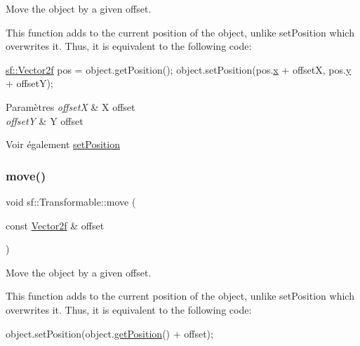 Move the object by a given offset. 

This function adds to the current position of the object, unlike set\+Position which overwrites it. Thus, it is equivalent to the following code\+: 
\begin{DoxyCode}
\hyperlink{classsf_1_1Vector2}{sf::Vector2f} pos = \textcolor{keywordtype}{object}.getPosition();
\textcolor{keywordtype}{object}.setPosition(pos.\hyperlink{classsf_1_1Vector2_a1e6ad77fa155f3753bfb92699bd28141}{x} + offsetX, pos.\hyperlink{classsf_1_1Vector2_a420f2481b015f4eb929c75f2af564299}{y} + offsetY);
\end{DoxyCode}



\begin{DoxyParams}{Paramètres}
{\em offsetX} & X offset \\
\hline
{\em offsetY} & Y offset\\
\hline
\end{DoxyParams}
\begin{DoxySeeAlso}{Voir également}
\hyperlink{classsf_1_1Transformable_a4dbfb1a7c80688b0b4c477d706550208}{set\+Position} 
\end{DoxySeeAlso}
\mbox{\label{classsf_1_1Transformable_ab9ca691522f6ddc1a40406849b87c469}} 
\subsubsection{\texorpdfstring{move()}{move()}\hspace{0.1cm}{\footnotesize\ttfamily [2/2]}}
{\footnotesize\ttfamily void sf\+::\+Transformable\+::move (\begin{DoxyParamCaption}\item[{const \hyperlink{classsf_1_1Vector2}{Vector2f} \&}]{offset }\end{DoxyParamCaption})}



Move the object by a given offset. 

This function adds to the current position of the object, unlike set\+Position which overwrites it. Thus, it is equivalent to the following code\+: 
\begin{DoxyCode}
\textcolor{keywordtype}{object}.setPosition(\textcolor{keywordtype}{object}.\hyperlink{classsf_1_1Transformable_a73f9739bc6e74db2cea154bc8e94ec46}{getPosition}() + offset);
\end{DoxyCode}




